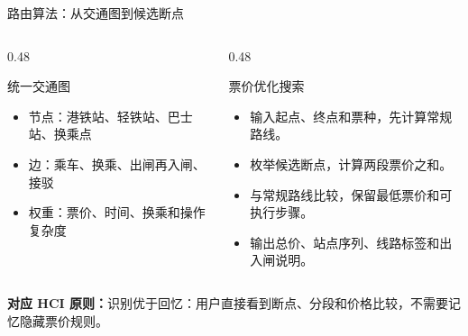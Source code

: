 \documentclass[aspectratio=169,10pt]{beamer}
\newcommand{\hciprinciple}[1]{\vspace{0.25em}\textcolor{MTRPurple}{\small\textbf{对应 HCI 原则：}#1}}
\begin{document}
\begin{frame}{路由算法：从交通图到候选断点}
  \begin{columns}[T,onlytextwidth]
    \begin{column}{0.48\textwidth}
      \begin{block}{统一交通图}
        \begin{itemize}
          \item 节点：港铁站、轻铁站、巴士站、换乘点
          \item 边：乘车、换乘、出闸再入闸、接驳
          \item 权重：票价、时间、换乘和操作复杂度
        \end{itemize}
      \end{block}
    \end{column}
    \begin{column}{0.48\textwidth}
      \begin{block}{票价优化搜索}
        \begin{itemize}
          \item 输入起点、终点和票种，先计算常规路线。
          \item 枚举候选断点，计算两段票价之和。
          \item 与常规路线比较，保留最低票价和可执行步骤。
          \item 输出总价、站点序列、线路标签和出入闸说明。
        \end{itemize}
      \end{block}
    \end{column}
  \end{columns}
  \hciprinciple{识别优于回忆：用户直接看到断点、分段和价格比较，不需要记忆隐藏票价规则。}
\end{frame}
\end{document}
